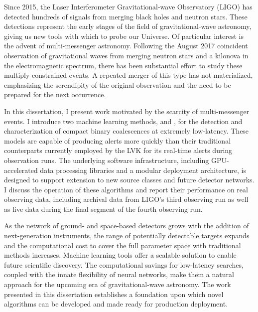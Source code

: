 
Since 2015, the Laser Interferometer Gravitational-wave Observatory (LIGO) has detected hundreds of signals from merging black holes and neutron stars.
These detections represent the early stages of the field of gravitational-wave astronomy, giving us new tools with which to probe our Universe.
Of particular interest is the advent of multi-messenger astronomy.
Following the August 2017 coincident observation of gravitational waves from merging neutron stars and a kilonova in the electromagnetic spectrum, there has been substantial effort to study these multiply-constrained events.
A repeated merger of this type has not materialized, emphasizing the serendipity of the original observation and the need to be prepared for the next occurrence.

In this dissertation, I present work motivated by the scarcity of multi-messenger events.
I introduce two machine learning methods, \aframe and \amplfi, for the detection and characterization of compact binary coalescences at extremely low-latency.
These models are capable of producing alerts more quickly than their traditional counterparts currently employed by the LVK for its real-time alerts during observation runs.
The underlying software infrastructure, including GPU-accelerated data processing libraries and a modular deployment architecture, is designed to support extension to new source classes and future detector networks.
I discuss the operation of these algorithms and report their performance on real observing data, including archival data from LIGO's third observing run as well as live data during the final segment of the fourth observing run.

As the network of ground- and space-based detectors grows with the addition of next-generation instruments, the range of potentially detectable targets expands and the computational cost to cover the full parameter space with traditional methods increases.
Machine learning tools offer a scalable solution to enable future scientific discovery.
The computational savings for low-latency searches, coupled with the innate flexibility of neural networks, make them a natural approach for the upcoming era of gravitational-wave astronomy.
The work presented in this dissertation establishes a foundation upon which novel algorithms can be developed and made ready for production deployment.



